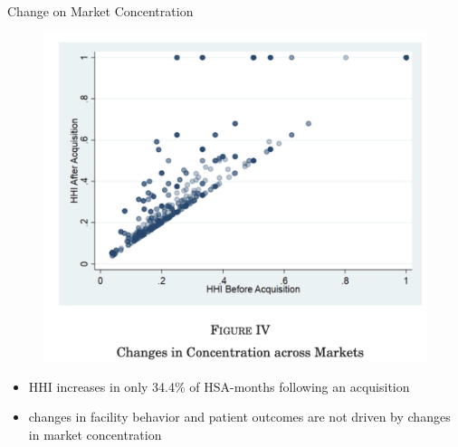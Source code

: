 \begin{frame}{Change on Market Concentration}
    \begin{figure}
        \centering
        \includegraphics[width=0.6\linewidth]{fig4.png}
    \end{figure}
    \begin{itemize}
        \item HHI increases in only 34.4\% of HSA-months following an acquisition
        \item changes in facility behavior and patient outcomes are not driven by changes in market concentration
    \end{itemize}
\end{frame}